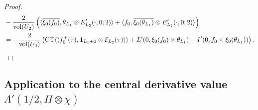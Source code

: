 \documentclass{amsart}
\theoremstyle{definition}
\begin{document}
\begin{proof}
\begin{equation*}
\begin{aligned}
&- \frac{2}{\operatorname{vol}(U_2)} \left(   \langle \overline{\xi_0(f_0)}, \theta_{L_1} \otimes E'_{L_2}(\cdot, 0; 2) \rangle 
+  \langle f_0, \overline{ \xi_0(\theta_{L_1})} \otimes E'_{L_2}(\cdot, 0; 2) \rangle \right) \\
&=  - \frac{2}{\operatorname{vol}(U_2)} \left( \operatorname{CT} \langle \langle f_0^+(\tau), {\bf{1}}_{L_1 + 0} \otimes \mathcal{E}_{L_2}(\tau) \rangle \rangle 
+  L'(0,\xi_0(f_0) \times \theta_{L_1}) + I'(0, f_0 \times \xi_0(\theta_{L_1})) \right). \end{aligned}\end{equation*} \end{proof}

\subsection{Application to the central derivative value $\Lambda'(1/2, \Pi \otimes \chi)$} 
\end{document}
